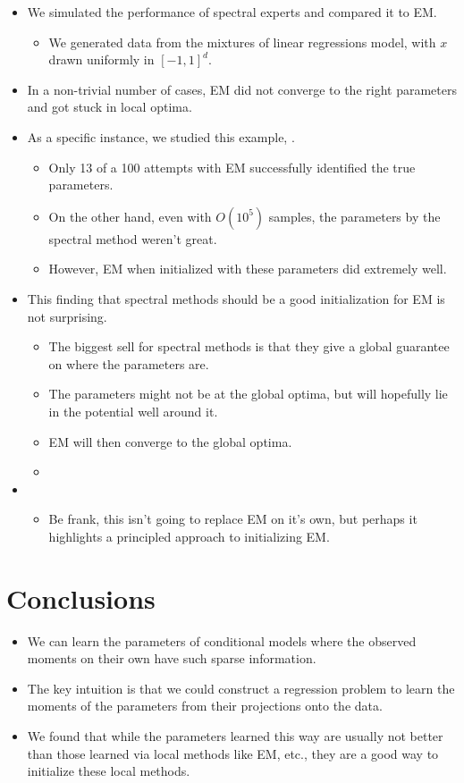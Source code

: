 \documentclass[tablecaption=bottom]{jmlr}
\begin{document}
\begin{itemize}
\item
  We simulated the performance of spectral experts and compared it to
  EM.
  \begin{itemize}
  \item
    We generated data from the mixtures of linear regressions model,
    with $x$ drawn uniformly in $[-1,1]^d$.
  \end{itemize}
\item
  In a non-trivial number of cases, EM did not converge to the right
  parameters and got stuck in local optima.
\item
  As a specific instance, we studied this example,
  .
  \begin{itemize}
  \item
    Only 13 of a 100 attempts with EM successfully identified the true
    parameters.
  \item
    On the other hand, even with $O(10^5)$ samples, the parameters by
    the spectral method weren't great.
  \item
    However, EM when initialized with these parameters did extremely
    well.
  \end{itemize}
\item
  This finding that spectral methods should be a good initialization for
  EM is not surprising.
  \begin{itemize}
  \item
    The biggest sell for spectral methods is that they give a global
    guarantee on where the parameters are.
  \item
    The parameters might not be at the global optima, but will hopefully
    lie in the potential well around it.
  \item
    EM will then converge to the global optima.
  \item
  \end{itemize}
\item
  \begin{itemize}
  \item
    Be frank, this isn't going to replace EM on it's own, but perhaps it
    highlights a principled approach to initializing EM.
  \end{itemize}
\end{itemize}
\section{Conclusions}

\begin{itemize}
\item
  We can learn the parameters of conditional models where the observed
  moments on their own have such sparse information.
\item
  The key intuition is that we could construct a regression problem to
  learn the moments of the parameters from their projections onto the
  data.
\item
  We found that while the parameters learned this way are usually not
  better than those learned via local methods like EM, etc., they are a
  good way to initialize these local methods.
\end{itemize}
\end{document}
